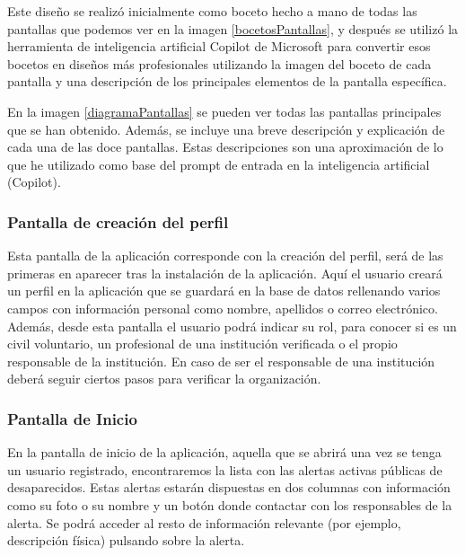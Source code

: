     Este diseño se realizó inicialmente como boceto hecho a mano de todas las pantallas que podemos ver en la imagen \ref{bocetosPantallas}, y después se utilizó la herramienta de inteligencia artificial Copilot de Microsoft \cite{copilot2025} para convertir esos bocetos en diseños más profesionales utilizando la imagen del boceto de cada pantalla y una descripción de los principales elementos de la pantalla específica.


    En la imagen \ref{diagramaPantallas} se pueden ver todas las pantallas principales que se han obtenido. Además, se incluye una breve descripción y explicación de cada una de las doce pantallas. Estas descripciones son una aproximación de lo que he utilizado como base del prompt de entrada en la inteligencia artificial (Copilot). 



    \subsubsection{Pantalla de creación del perfil}
    Esta pantalla de la aplicación corresponde con la creación del perfil, será de las primeras en aparecer tras la instalación de la aplicación. Aquí el usuario creará un perfil en la aplicación que se guardará en la base de datos rellenando varios campos con información personal como nombre, apellidos o correo electrónico. Además, desde esta pantalla el usuario podrá indicar su rol, para conocer si es un civil voluntario, un profesional de una institución verificada o el propio responsable de la institución. En caso de ser el responsable de una institución deberá seguir ciertos pasos para verificar la organización.
    
    

    \vspace{3cm}

    \subsubsection{Pantalla de Inicio}
    En la pantalla de inicio de la aplicación, aquella que se abrirá una vez se tenga un usuario registrado, encontraremos la lista con las alertas activas públicas de desaparecidos. Estas alertas estarán dispuestas en dos columnas con información como su foto o su nombre y un botón donde contactar con los responsables de la alerta. Se podrá acceder al resto de información relevante (por ejemplo, descripción física) pulsando sobre la alerta. 

